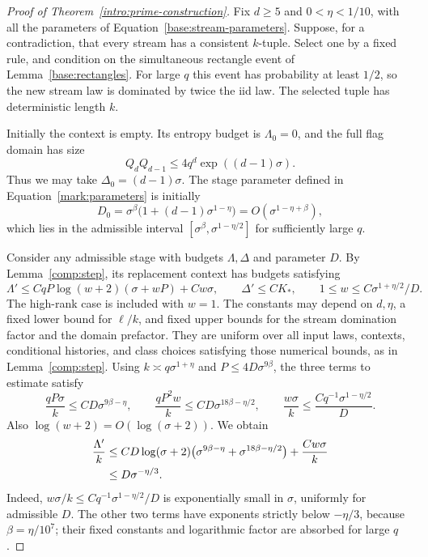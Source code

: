\begin{proof}[Proof of Theorem~\ref{intro:prime-construction}]
Fix $d\ge5$ and $0<\eta<1/10$, with all the parameters of
Equation~\eqref{base:stream-parameters}. Suppose, for a contradiction,
that every stream has a consistent $k$-tuple. Select one by a fixed
rule, and condition on the simultaneous rectangle event of
Lemma~\ref{base:rectangles}. For large $q$ this event has probability
at least $1/2$, so the new stream law is dominated by twice the iid
law. The selected tuple has deterministic length $k$.

Initially the context is empty. Its entropy budget is $\Lambda_0=0$,
and the full flag domain has size
\[
 Q_dQ_{d-1}\le4q^d\exp((d-1)\sigma).
\]
Thus we may take $\Delta_0=(d-1)\sigma$. The stage parameter defined
in Equation~\eqref{mark:parameters} is initially
\[
 D_0=\sigma^\beta\bigl(1+(d-1)\sigma^{1-\eta}\bigr)
     =O(\sigma^{1-\eta+\beta}),
\]
which lies in the admissible interval
$[\sigma^\beta,\sigma^{1-\eta/2}]$ for sufficiently large $q$.

Consider any admissible stage with budgets $\Lambda,\Delta$ and
parameter $D$. By Lemma~\ref{comp:step}, its replacement context has
budgets satisfying
\begin{equation}
 \Lambda'\le CqP\log(w+2)(\sigma+wP)+Cw\sigma,
 \qquad \Delta'\le CK_*,
 \qquad 1\le w\le C\sigma^{1+\eta/2}/D.
 \label{end:one-step-budget}
\end{equation}
The high-rank case is included with $w=1$. The constants may depend on
$d,\eta$, a fixed lower bound for $\ell/k$, and fixed upper bounds for
the stream domination factor and the domain prefactor. They are uniform
over all input laws, contexts, conditional histories, and class choices
satisfying those numerical bounds, as in Lemma~\ref{comp:step}.
Using $k\asymp q\sigma^{1+\eta}$ and
$P\le4D\sigma^{9\beta}$, the three terms to estimate satisfy
\[
 \frac{qP\sigma}{k}\le CD\sigma^{9\beta-\eta},\qquad
 \frac{qP^2w}{k}\le CD\sigma^{18\beta-\eta/2},\qquad
 \frac{w\sigma}{k}\le\frac{Cq^{-1}\sigma^{1-\eta/2}}{D}.
\]
Also $\log(w+2)=O(\log(\sigma+2))$. We obtain
\begin{align}
 \frac{\Lambda'}{k}
 &\le CD\log(\sigma+2)
       \bigl(\sigma^{9\beta-\eta}
                  +\sigma^{18\beta-\eta/2}\bigr)
       +\frac{Cw\sigma}{k}\notag\\
 &\le D\sigma^{-\eta/3}.
 \label{end:entropy-contraction}
\end{align}
Indeed, $w\sigma/k\le Cq^{-1}\sigma^{1-\eta/2}/D$ is exponentially
small in $\sigma$, uniformly for admissible $D$. The other two terms
have exponents strictly below $-\eta/3$, because
$\beta=\eta/10^7$; their fixed constants and logarithmic factor are
absorbed for large $q$.


\end{proof}
